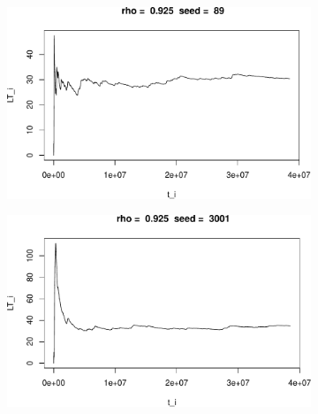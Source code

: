 \documentclass[]{article}
\begin{document}
\begin{figure}[h!]
\begin{subfigure}[b]{.55\linewidth}
\includegraphics[width=\linewidth]{003_files/figure-latex/unnamed-chunk-22-7.pdf}
\end{subfigure}\hfill
\begin{subfigure}[b]{.55\linewidth}
\includegraphics[width=\linewidth]{003_files/figure-latex/unnamed-chunk-22-8.pdf}
\end{subfigure}\vfill
\end{figure}
\end{document}
